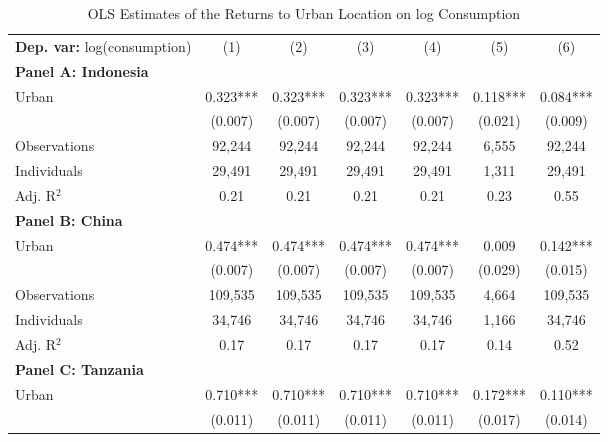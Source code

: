 \begin{table}[htbp] \centering \begin{threeparttable}
 \caption{OLS Estimates of the Returns to Urban Location on log Consumption} 
 \label{tab:OLS_cons_urb_unb} 
\begin{tabular}{l cccccc} \toprule  \textbf{Dep. var:}  log(consumption) 
                    &\multicolumn{1}{c}{(1)}   &\multicolumn{1}{c}{(2)}   &\multicolumn{1}{c}{(3)}   &\multicolumn{1}{c}{(4)}   &\multicolumn{1}{c}{(5)}   &\multicolumn{1}{c}{(6)}   \\
\textbf{Panel A: Indonesia} \\
Urban               &       0.323***&       0.323***&       0.323***&       0.323***&       0.118***&       0.084***\\
                    &     (0.007)   &     (0.007)   &     (0.007)   &     (0.007)   &     (0.021)   &     (0.009)   \\
\addlinespace
Observations        &      92,244   &      92,244   &      92,244   &      92,244   &       6,555   &      92,244   \\
Individuals         &      29,491   &      29,491   &      29,491   &      29,491   &       1,311   &      29,491   \\
Adj. R$^{2}$        &        0.21   &        0.21   &        0.21   &        0.21   &        0.23   &        0.55   \\
\cmidrule{2 -7}
\textbf{Panel B: China} \\
Urban               &       0.474***&       0.474***&       0.474***&       0.474***&       0.009   &       0.142***\\
                    &     (0.007)   &     (0.007)   &     (0.007)   &     (0.007)   &     (0.029)   &     (0.015)   \\
\addlinespace
Observations        &     109,535   &     109,535   &     109,535   &     109,535   &       4,664   &     109,535   \\
Individuals         &      34,746   &      34,746   &      34,746   &      34,746   &       1,166   &      34,746   \\
Adj. R$^{2}$        &        0.17   &        0.17   &        0.17   &        0.17   &        0.14   &        0.52   \\
\cmidrule{2-7}
\textbf{Panel C: Tanzania} \\
Urban               &       0.710***&       0.710***&       0.710***&       0.710***&       0.172***&       0.110***\\
                    &     (0.011)   &     (0.011)   &     (0.011)   &     (0.011)   &     (0.017)   &     (0.014)   \\

\end{tabular}
\end{threeparttable}
\end{table}
